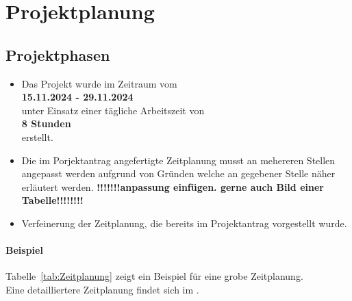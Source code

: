 \section{Projektplanung} 
\label{sec:Projektplanung}


\subsection{Projektphasen}
\label{sec:Projektphasen}

\begin{itemize}
	\item Das Projekt wurde im Zeitraum vom\\
	\textbf{15.11.2024 - 29.11.2024}\\
	unter Einsatz einer tägliche Arbeitszeit von\\
	\textbf{8 Stunden}\\
	erstellt.
    \item Die im Porjektantrag angefertigte Zeitplanung musst an mehereren Stellen angepasst werden aufgrund von Gründen welche an 
	gegebener Stelle näher erläutert werden. 
	 \textbf{!!!!!!!anpassung einfügen. gerne auch Bild einer Tabelle!!!!!!!!}

	\item Verfeinerung der Zeitplanung, die bereits im Projektantrag vorgestellt wurde.
\end{itemize}

\paragraph{Beispiel}
Tabelle~\ref{tab:Zeitplanung} zeigt ein Beispiel für eine grobe Zeitplanung.
\\
Eine detailliertere Zeitplanung findet sich im .


